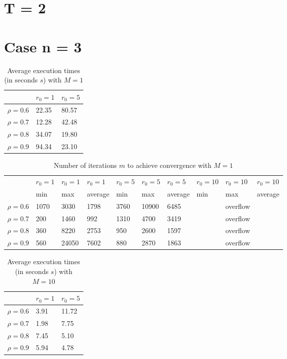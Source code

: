 \documentclass[a4paper,11pt,openright]{report}
\begin{document}
\section{T = 2}
\section*{Case n = 3} 
\begin{table}[H]
\centering
\addtolength{\leftskip}{-1.5cm}
\addtolength{\rightskip}{-1.5cm}
\begin{tabular}{|c|ll|}
\hline
$ $ & $r_0 = 1$ & $r_0 = 5$ \\
\hline
$\rho = 0.6$ & 22.35 & 80.57 \\

$\rho = 0.7$ & 12.28 & 42.48 \\

$\rho = 0.8$ & 34.07 & 19.80 \\

$\rho = 0.9$ & 94.34 & 23.10 \\
\hline
\end{tabular}
\caption{Average execution
 times (in seconds $s$) with $M = 1$}
\end{table}
\begin{table}[H]
\centering
\addtolength{\leftskip}{-1.5cm}
\addtolength{\rightskip}{-1.5cm}
\begin{tabular}{|c|lllllllll|}
\hline
$ $ & $r_0 = 1$ & $r_0 = 1$ & $r_0 = 1$ & $r_0 = 5$ & $r_0 = 5$ & $r_0 = 5$ & $r_0 = 10$ & $r_0 = 10$ & $r_0 = 10$  \\
$ $ & min & max & average & min & max & average & min & max & average \\ 
\hline
$\rho = 0.6$ & 1070 & 3030 & 1798 & 3760 & 10900 & 6485 &  & overflow &  \\

$\rho = 0.7$ & 200 & 1460 & 992 & 1310 & 4700 & 3419 &  & overflow &  \\

$\rho = 0.8$ & 360 & 8220 & 2753 & 950 & 2600 & 1597 &  & overflow & \\

$\rho = 0.9$ & 560 & 24050 & 7602 & 880 & 2870 & 1863 &  & overflow & \\
\hline
\end{tabular}
\caption{Number of iterations $m$ to achieve convergence with $M = 1$}
\end{table}
\begin{table}[H]
\centering
\addtolength{\leftskip}{-1.5cm}
\addtolength{\rightskip}{-1.5cm}
\begin{tabular}{|c|ll|}
\hline
$ $ & $r_0 = 1$ & $r_0 = 5$ \\
\hline
$\rho = 0.6$ & 3.91 & 11.72 \\

$\rho = 0.7$ & 1.98 & 7.75 \\

$\rho = 0.8$ & 7.45 & 5.10 \\

$\rho = 0.9$ & 5.94 & 4.78 \\
\hline
\end{tabular}
\caption{Average execution
 times (in seconds $s$) with $M = 10$}
\end{table}
\end{document}
